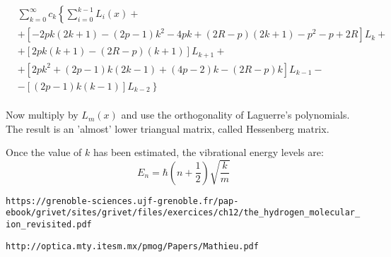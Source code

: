 \documentclass[11pt, oneside]{article}   	%
\begin{document}
\begin{equation}
\begin{split}
&  \sum_{k=0}^{\infty}c_k \left\{ \sum_{i = 0}^{k-1}{L_i(x)}  +  \right. \\[.8em] 
& + \left[ -2pk(2k+1) -(2p-1)k^2 -4pk +(2R-p)(2k+1) - p^2 -p + 2R \right]L_k + \\[.8em]
& + \left[2pk(k+1) - (2R-p)(k+1) \right]L_{k+1} + \\[.8em]
& + \left[2pk^2 + (2p-1)k(2k-1) + (4p-2)k - (2R-p)k \right]L_{k-1} - \\[.8em]
& \left. - \left[ (2p-1)k(k-1)  \right]L_{k-2}  \right\}
\end{split}
\end{equation}\\[1em]

Now multiply by $ L_m(x) $ and use the orthogonality of Laguerre's polynomials. The result is an 'almost' lower triangual matrix, called Hessenberg matrix.

Once the value of $ k $ has been estimated, the vibrational energy levels are:
\begin{equation}
E_n = \hbar\left(n + \frac{1}{2}\right)\sqrt{\frac{k}{m}}
\end{equation}


\verb+https://grenoble-sciences.ujf-grenoble.fr/pap-ebook/grivet/sites/grivet/files/exercices/ch12/the_hydrogen_molecular_ion_revisited.pdf+

\verb+http://optica.mty.itesm.mx/pmog/Papers/Mathieu.pdf+
\end{document}
